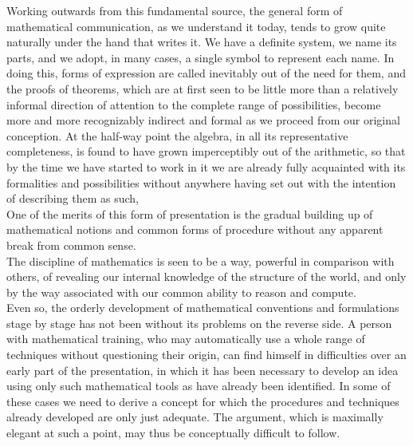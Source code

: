 \documentclass[a4paper]{article}
\theoremstyle{remark}
\begin{document}
Working  outwards  from  this fundamental  source, the  general  form   of  mathematical   communication,   as   we  understand   it   today,  tends  to  grow  quite naturally  under  the hand  that  writes  it. We  have  a  definite  system,  we name  its parts,  and  we  adopt,  in  many   cases,   a  single  symbol   to  represent  each  name.   In   doing  this,  forms  of  expression  are  called  inevitably  out  of  the  need  for  them,  and  the  proofs  of  theorems,  which  are  at   first   seen  to  be  little  more  than  a  relatively  informal   direction   of   attention  to  the  complete  range  of  possibilities,  become  more  and   more   recognizably   indirect   and   formal   as   we   proceed   from  our  original conception.  At the half-way  point the  algebra,  in  all  its  representative  completeness,  is  found  to  have  grown  imperceptibly  out  of  the arithmetic,  so that  by the time  we  have  started  to  work  in  it  we  are  already  fully  acquainted  with  its  formalities  and  possibilities  without  anywhere  having  set  out  with  the  intention  of  describing  them  as  such, \\

One  of  the  merits  of  this  form  of  presentation  is the  gradual  building  up  of  mathematical  notions  and  common  forms   of   procedure  without  any  apparent  break  from   common   sense. \\

The  discipline  of  mathematics  is  seen  to  be  a  way,   powerful   in comparison  with  others,  of  revealing  our  internal  knowledge  of  the  structure  of  the  world,  and  only  by  the  way  associated  with  our  common  ability  to  reason  and  compute.
\\
Even so, the orderly development  of  mathematical conventions and formulations  stage  by  stage  has  not  been  without  its  problems   on   the reverse side. A person with  mathematical   training,  who  may  automatically use a whole range  of  techniques  without   questioning   their origin, can find   himself in difficulties over  an  early  part  of  the  presentation,  in  which  it  has  been  necessary  to  develop  an  idea using  only  such  mathematical  tools as have  already  been  identified.  In  some  of  these  cases  we  need  to  derive  a  concept  for  which  the  procedures  and  techniques  already developed  are  only just  adequate.  The  argument,  which  is maximally  elegant  at  such  a  point,  may  thus  be  conceptually difficult  to  follow.\\
\end{document}

